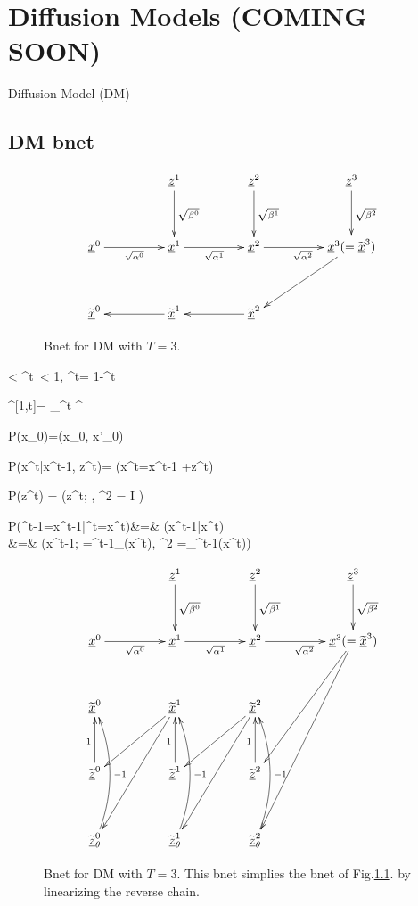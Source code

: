 \chapter{Diffusion Models (COMING SOON)}
\label{ch-diffusion}

Diffusion Model (DM)

\section{DM bnet}
\begin{figure}[h!]
$$
\xymatrix@C=4pc@R=3pc{
&\rvz^1\ar[d]^{\sqrt{\beta^0}}
&\rvz^2\ar[d]^{\sqrt{\beta^1}}
&\rvz^3\ar[d]^{\sqrt{\beta^2}}
\\
\rvx^0\ar[r]_{\sqrt{\alp^0}}
&\rvx^1\ar[r]_{\sqrt{\alp^1}}
&\rvx^2\ar[r]_{\sqrt{\alp^2}}
&\rvx^3(= \TIL{\rvx}^3)\ar[dl]
\\
\TIL{\rvx}^0
&\TIL{\rvx}^1\ar[l]
&\TIL{\rvx}^2\ar[l]
&
}
$$
\caption{Bnet for DM with $T=3$.}
\label{fig-diffusion1}
\end{figure}


< \alp^t\
< 1, \; \beta^t= 1-\alp^t
\eeq

\beq
\alp^{[1,t]}= \prod_{}^t \alp^\tau
\eeq

\beq \color{blue}
P(x_0)=\delta(x_0, x'_0)
\quad {}
\eeq

\beq \color{blue}
P(x^t|x^{t-1}, z^{t})=
\indi(\quad x^t=\;x^{t-1}
+\;z^{t}\quad)
\eeq

\beq \color{blue}
P(z^t) = \caln(z^t; ,
 \s^2 =  I )
\eeq

\beqa \color{blue}
P(\TIL{\rvx}^{t-1}=x^{t-1}|\TIL{\rvx}^{t}=x^{t})&=&\color{blue}
\tilPT(x^{t-1}|x^{t})
\\
&=&\color{blue}
\caln(x^{t-1}; \mu=\mu^{t-1}_\theta(x^t),
\s^2 =\Sigma_\theta^{t-1}(x^t))
 \eeqa
 
 \begin{figure}[h!]
 $$
 \xymatrix@C=4pc@R=3pc{
 &\rvz^1\ar[d]^{\sqrt{\beta^0}}
 &\rvz^2\ar[d]^{\sqrt{\beta^1}}
 &\rvz^3\ar[d]^{\sqrt{\beta^2}}
 \\
 \rvx^0\ar[r]_{\sqrt{\alp^0}}
 &\rvx^1\ar[r]_{\sqrt{\alp^1}}
 &\rvx^2\ar[r]_{\sqrt{\alp^2}}
 &\rvx^3(= \TIL{\rvx}^3)\ar[ddl]\ar[dddl]
 \\
 \TIL{\rvx}^0
 &\TIL{\rvx}^1\ar[dl]\ar[ddl]
 &\TIL{\rvx}^2\ar[dl]\ar[ddl]
 \\
 \TIL{\rvz}^0\ar[u]^{1}
 &\TIL{\rvz}^1\ar[u]^{1}
 &\TIL{\rvz}^2\ar[u]^{1}
 \\
 \TIL{\rvz}_\theta^0\ar@/_1pc/[uu]_{-1}
 &\TIL{\rvz}_\theta^1\ar@/_1pc/[uu]_{-1}
 &\TIL{\rvz}_\theta^2\ar@/_1pc/[uu]_{-1}
 }
 $$
 \caption{Bnet for DM with $T=3$.
 This bnet simplies
 the bnet of Fig.\ref{fig-diffusion1}.
 by linearizing the reverse chain.}
 \label{fig-diffusion2}
 \end{figure}
 
